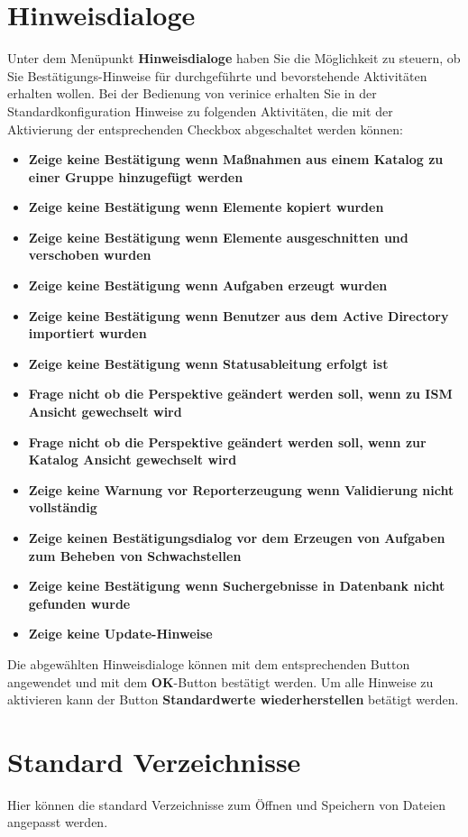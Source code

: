 \documentclass[a4paper,10pt]{book}
\begin{document}
\section{Hinweisdialoge}
Unter dem Menüpunkt \textbf{Hinweisdialoge} haben Sie die Möglichkeit zu steuern, ob Sie Bestätigungs-Hinweise für durchgeführte und
bevorstehende Aktivitäten erhalten wollen. Bei der Bedienung von verinice erhalten Sie in der Standardkonfiguration Hinweise zu
folgenden Aktivitäten, die mit der Aktivierung der entsprechenden Checkbox abgeschaltet werden können:
\begin{itemize}
 \item \textbf{Zeige keine Bestätigung wenn Maßnahmen aus einem Katalog zu einer Gruppe hinzugefügt werden}
 \item \textbf{Zeige keine Bestätigung wenn Elemente kopiert wurden}
 \item \textbf{Zeige keine Bestätigung wenn Elemente ausgeschnitten und verschoben wurden}
 \item \textbf{Zeige keine Bestätigung wenn Aufgaben erzeugt wurden}
 \item \textbf{Zeige keine Bestätigung wenn Benutzer aus dem Active Directory importiert wurden}
 \item \textbf{Zeige keine Bestätigung wenn Statusableitung erfolgt ist}
 \item \textbf{Frage nicht ob die Perspektive geändert werden soll, wenn zu ISM Ansicht gewechselt wird}
 \item \textbf{Frage nicht ob die Perspektive geändert werden soll, wenn zur Katalog Ansicht gewechselt wird}
 \item \textbf{Zeige keine Warnung vor Reporterzeugung wenn Validierung nicht vollständig}
 \item \textbf{Zeige keinen Bestätigungsdialog vor dem Erzeugen von Aufgaben zum Beheben von Schwachstellen}
 \item \textbf{Zeige keine Bestätigung wenn Suchergebnisse in Datenbank nicht gefunden wurde}
 \item \textbf{Zeige keine Update-Hinweise}
\end{itemize}
Die abgewählten Hinweisdialoge können mit dem entsprechenden Button angewendet und mit dem \textbf{OK}-Button bestätigt werden.
Um alle Hinweise zu aktivieren kann der Button \textbf{Standardwerte wiederherstellen} betätigt werden.

\section{Standard Verzeichnisse}\label{sec:default_dir}
Hier können die standard Verzeichnisse zum Öffnen und Speichern von Dateien
angepasst werden.
\end{document}
